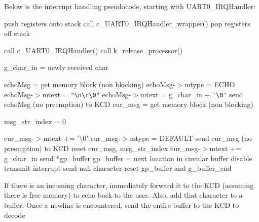 \documentclass[12pt]{report}
\begin{document}
Below is the interrupt handling pseudocode, starting with UART0_IRQHandler:
\begin{algorithmic}[1]
    \State push registers onto stack
    \State call c_UART0_IRQHandler_wrapper()
    \State pop registers off stack
  \EndFunction
\end{algorithmic}
\begin{algorithmic}[1]
    \State call c_UART0_IRQHandler()
      \State call k_release_processor()
    \EndIf
  \EndFunction
\end{algorithmic}
\begin{algorithmic}[1]
      \State g_char_in = newly received char
        \State\Return
      \EndIf

      \State echoMsg = get memory block (non blocking)
        \State echoMsg-$>$mtype = ECHO
          \State echoMsg-$>$mtext = \verb|"\n\r\0"|
        \Else
          \State echoMsg-$>$mtext = g_char_in + \verb|'\0'|
        \EndIf
        \State send echoMsg (no preemption) to KCD
      \EndIf
        \State cur_msg = get memory block (non blocking)
          \State\Return
        \EndIf

        \State msg_str_index = 0
      \EndIf

        \State cur_msg-$>$mtext += '\textbackslash 0'
        \State cur_msg-$>$mtype = DEFAULT
        \State send cur_msg (no preemption) to KCD
        \State reset cur_msg, msg_str_index
      \Else
        \State cur_msg-$>$mtext += g_char_in
      \EndIf
        \State send *gp_buffer
        \State gp_buffer = next location in circular buffer
      \Else
        \State disable transmit interrupt
        \State send null character
        \State reset gp_buffer and g_buffer_end
      \EndIf
    \EndIf
  \EndFunction
\end{algorithmic}

If there is an incoming character, immediately forward it to the KCD (assuming there is free memory) to echo back to the user. Also, add that character to a buffer. Once a newline is encountered, send the entire buffer to the KCD to decode
\end{document}
